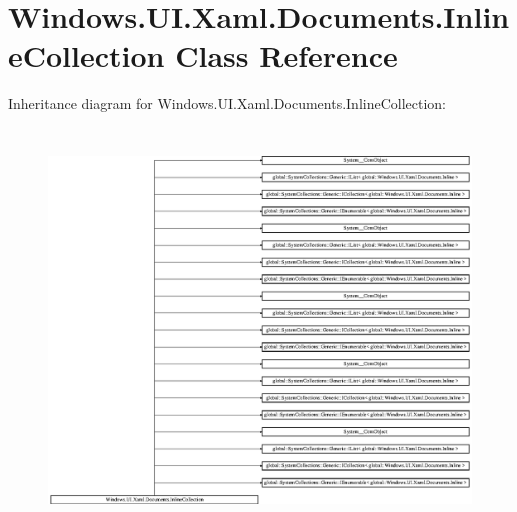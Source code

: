 \hypertarget{class_windows_1_1_u_i_1_1_xaml_1_1_documents_1_1_inline_collection}{}\section{Windows.\+U\+I.\+Xaml.\+Documents.\+Inline\+Collection Class Reference}
\label{class_windows_1_1_u_i_1_1_xaml_1_1_documents_1_1_inline_collection}
Inheritance diagram for Windows.\+U\+I.\+Xaml.\+Documents.\+Inline\+Collection\+:\begin{figure}[H]
\begin{center}
\leavevmode
\includegraphics[height=10.690908cm]{class_windows_1_1_u_i_1_1_xaml_1_1_documents_1_1_inline_collection}
\end{center}
\end{figure}
